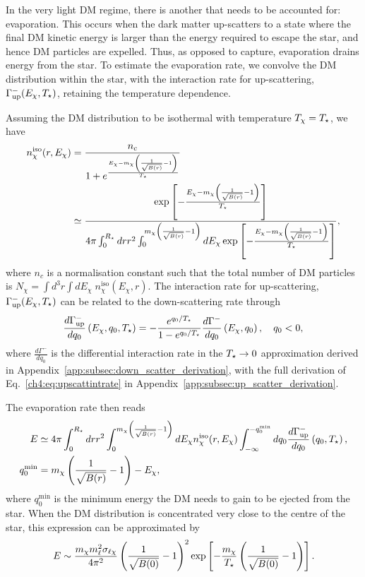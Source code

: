 In the very light DM regime, there is another that needs to be accounted for: evaporation. This occurs when the dark matter up-scatters to a state where the final DM kinetic energy is larger than the energy required to escape the star, and hence DM particles are expelled. Thus, as opposed to capture, evaporation drains energy from the star. 
To estimate the evaporation rate, we convolve the DM distribution within the star, with the interaction rate for up-scattering, $\Gamma^-_\mathrm{up}(E_\chi, T_\star)$, retaining the temperature dependence.

Assuming the DM distribution to be isothermal with temperature $T_\chi=T_\star$, we have 
\begin{align}
n_\chi^\mathrm{iso}(r,E_\chi) &= \frac{n_c}{1+e^{\frac{E_\chi-m_\chi\left(\frac{1}{\sqrt{B(r)}}-1\right)}{T_\star}}} \\
& \simeq \frac{ \exp\left[-\frac{E_\chi-m_\chi\left(\frac{1}{\sqrt{B(r)}}-1\right)}{T_\star}\right]}{4\pi \int_0^{R_\star} dr r^2  \int_0^{m_\chi\left(\frac{1}{\sqrt{B(r)}}-1\right)} dE_\chi \exp \left[{-\frac{E_\chi-m_\chi\left(\frac{1}{\sqrt{B(r)}}-1\right)}{T_\star}}\right]}, 
\end{align}
where $n_c$ is a normalisation constant such that the total number of DM particles is $N_\chi = \int d^3r\int dE_\chi\;n_\chi^\mathrm{iso}(E_\chi, r)$. The interaction rate for up-scattering, $\Gamma^-_\mathrm{up}(E_\chi, T_\star)$ can be related to the down-scattering rate through
\begin{equation}
\frac{d\Gamma^-_\mathrm{up}}{dq_0}\left(E_\chi, q_0,T_\star\right) = -\frac{e^{q_0/T_\star}}{1-e^{q_0/T_\star}} \dfrac{d\Gamma^-}{dq_0}\left(E_\chi, q_0\right),\quad q_0<0,
\label{ch4:eq:upscattintrate}
\end{equation}
where $\tfrac{d\Gamma^-}{dq_0}$ is the differential interaction rate in the $T_\star\rightarrow 0$ approximation derived in Appendix~\ref{app:subsec:down_scatter_derivation}, with the full derivation of Eq.~\ref{ch4:eq:upscattintrate} in Appendix~\ref{app:subsec:up_scatter_derivation}. 

The evaporation rate then reads
\small
\begin{align}
E &\simeq 4\pi \int_0^{R_\star} dr r^2 \int_0^{m_\chi\left(\frac{1}{\sqrt{B(r)}}-1\right)}dE_\chi n_\chi^\mathrm{iso}(r,E_\chi) \int_{-\infty}^{-q_0^\mathrm{min}} dq_0 \frac{d\Gamma^-_\mathrm{up}}{dq_0}\left(q_0,T_\star\right), \\
q_0^\mathrm{min} & = m_\chi\left(\frac{1}{\sqrt{B(r)}}-1\right)-E_\chi,
\label{ch4:eq:evaprate}
\end{align}
\normalsize
where $q_0^\mathrm{min}$ is the minimum energy the DM needs to gain to be ejected from the star.
When the DM distribution is concentrated very close to the centre of the star, this expression can be approximated by
\begin{equation}
E \sim  \frac{ m_\chi m_\ell^2\sigma_{\ell\chi}}{4\pi^2} \left(\frac{1}{\sqrt{B(0)}}-1\right)^2  \exp\left[{-\frac{m_\chi}{T_\star}}\left(\frac{1}{\sqrt{B(0)}}-1\right)\right]. \end{equation}


